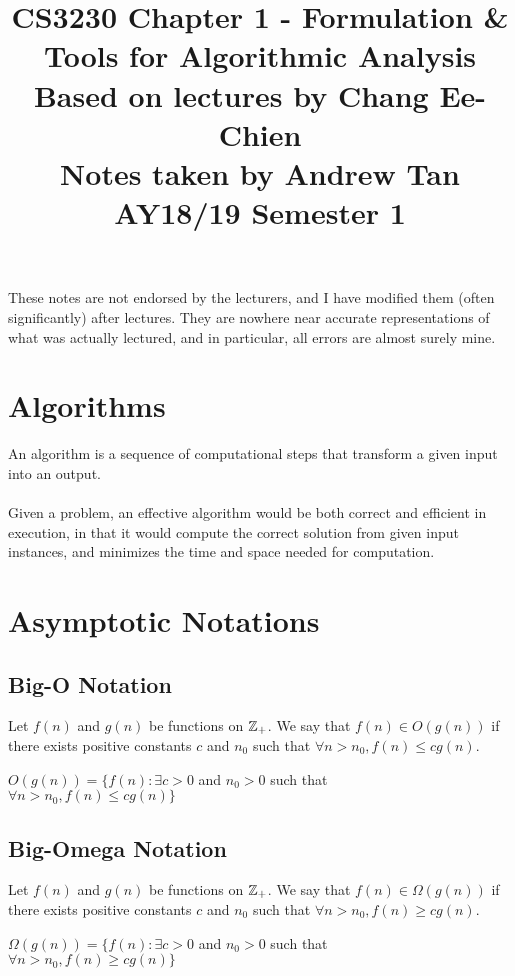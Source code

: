 \documentclass[a4paper]{article}
\title{%
	CS3230 Chapter 1 - Formulation \& Tools for Algorithmic Analysis \\
	\large Based on lectures by Chang Ee-Chien
	\\ Notes taken by Andrew Tan
	\\ AY18/19 Semester 1
	\\ }
\author{}
\date{\vspace{-5ex}}
\begin{document}
\maketitle

\begin{center}\begin{minipage}[c]{0.9\textwidth}\centering\footnotesize These notes are not endorsed by the lecturers, and I have modified them (often significantly) after lectures. They are nowhere near accurate representations of what was actually lectured, and in particular, all errors are almost surely mine.\end{minipage}\end{center}

\section{Algorithms}
An algorithm is a sequence of computational steps that transform a given input into an output.\\ \\Given a problem, an effective algorithm would be both correct and efficient in execution, in that it would compute the correct solution from given input instances, and minimizes the time and space needed for computation.

\section{Asymptotic Notations}
\subsection{Big-O Notation}
Let $f(n)$ and $g(n)$ be functions on $\mathbb{Z}_{+}$. We say that $f(n) \in O(g(n))$ if there exists positive constants $c$ and $n_0$ such that $\forall n > n_0, f(n) \le cg(n)$.
\begin{center} $O(g(n)) = \{f(n): \exists c>0$ and $n_0>0$ such that \\$\forall n>n_0, f(n) \le cg(n)\}$ \end{center}

\subsection{Big-Omega Notation}
Let $f(n)$ and $g(n)$ be functions on $\mathbb{Z}_{+}$. We say that $f(n) \in \Omega(g(n))$ if there exists positive constants $c$ and $n_0$ such that $\forall n > n_0, f(n) \ge cg(n)$.
\begin{center} $\Omega(g(n)) = \{f(n): \exists c>0$ and $n_0>0$ such that \\$\forall n>n_0, f(n) \ge cg(n)\}$ \end{center}
\end{document}
